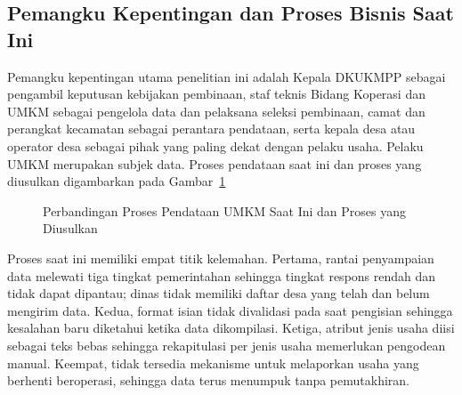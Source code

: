 \documentclass[12pt,a4paper]{report}
\begin{document}
\subsection{Pemangku Kepentingan dan Proses Bisnis Saat Ini}

Pemangku kepentingan utama penelitian ini adalah Kepala DKUKMPP sebagai pengambil keputusan kebijakan pembinaan, staf teknis Bidang Koperasi dan UMKM sebagai pengelola data dan pelaksana seleksi pembinaan, camat dan perangkat kecamatan sebagai perantara pendataan, serta kepala desa atau operator desa sebagai pihak yang paling dekat dengan pelaku usaha. Pelaku UMKM merupakan subjek data. Proses pendataan saat ini dan proses yang diusulkan digambarkan pada Gambar~\ref{fig:asis-tobe}

\begin{figure}[H]
  \centering
  \caption{Perbandingan Proses Pendataan UMKM Saat Ini dan Proses yang Diusulkan}
  \label{fig:asis-tobe}
\end{figure}

Proses saat ini memiliki empat titik kelemahan. Pertama, rantai penyampaian data melewati tiga tingkat pemerintahan sehingga tingkat respons rendah dan tidak dapat dipantau; dinas tidak memiliki daftar desa yang telah dan belum mengirim data. Kedua, format isian tidak divalidasi pada saat pengisian sehingga kesalahan baru diketahui ketika data dikompilasi. Ketiga, atribut jenis usaha diisi sebagai teks bebas sehingga rekapitulasi per jenis usaha memerlukan pengodean manual. Keempat, tidak tersedia mekanisme untuk melaporkan usaha yang berhenti beroperasi, sehingga data terus menumpuk tanpa pemutakhiran.
\end{document}
